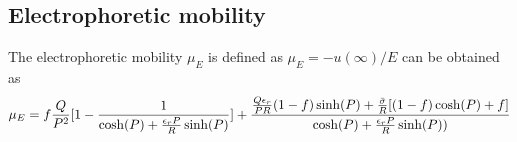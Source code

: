 \documentclass[11 pt]{article}
\begin{document}
\subsection{Electrophoretic mobility}

The electrophoretic mobility $\mu_E$ is defined as $\mu_E=-u(\infty)/E$ can be obtained as
\begin{equation}\label{9}
  \mu_E =f\frac{Q}{{P}^{2}}[1-\frac{1}{\cosh(P)+\frac{\epsilon_{r}P}{R}\sinh(P)}]+\\
  \frac{\frac{Q\epsilon_{r}}{PR}(1-f)\sinh(P)+\frac{\bar \sigma}{R}[(1-f)\cosh(P)+f]}{\cosh(P)+\frac{\epsilon_{r}P}{R}\sinh(P))}
\end{equation}
%
\end{document}
